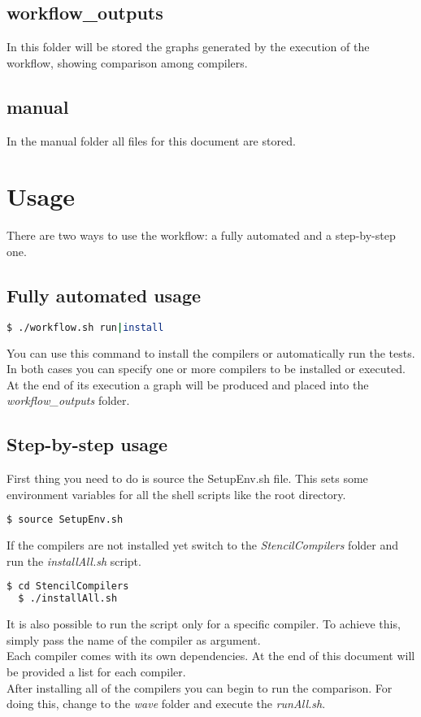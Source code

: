 \documentclass[AEJ]{AEA}
\begin{document}
\subsection{workflow\_outputs}
In this folder will be stored the graphs generated by the execution of the workflow, showing comparison among compilers.

\subsection{manual}
In the manual folder all files for this document are stored.

\section{Usage}
There are two ways to use the workflow: a fully automated and a step-by-step one.
\subsection{Fully automated usage}
\begin{lstlisting}[frame=single,language=bash]
  $ ./workflow.sh run|install
\end{lstlisting}

You can use this command to install the compilers or automatically run the tests. In both cases you can specify one or more compilers to be installed or executed. At the end of its execution a graph will be produced and placed into the  \emph{workflow\_outputs} folder.
\subsection{Step-by-step usage}
First thing you need to do is source the SetupEnv.sh file. This sets some environment variables for all the shell scripts like the root directory.

\begin{lstlisting}[frame=single,language=bash]
  $ source SetupEnv.sh
\end{lstlisting}

If the compilers are not installed yet switch to the \emph{StencilCompilers} folder and run the \emph{installAll.sh} script. 
\begin{lstlisting}[frame=single,language=bash]
  $ cd StencilCompilers
  $ ./installAll.sh 
\end{lstlisting}

It is also possible to run the script only for a specific compiler. To achieve this, simply pass the name of the compiler as argument.
\\
Each compiler comes with its own dependencies. At the end of this document will be provided a list for each compiler. 
\\
After installing all of the compilers you can begin to run the comparison. For doing this, change to the\emph{ wave} folder and execute the \emph{runAll.sh}.
\end{document}
